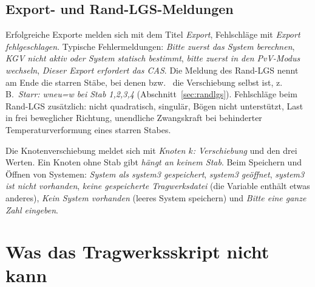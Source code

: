 \subsection{Export- und Rand-LGS-Meldungen}

Erfolgreiche Exporte melden sich mit dem Titel \emph{Export}, Fehlschläge mit \emph{Export
fehlgeschlagen}. Typische Fehlermeldungen: \emph{Bitte zuerst das System berechnen}, \emph{KGV
nicht aktiv oder System statisch bestimmt}, \emph{bitte zuerst in den PvV-Modus wechseln},
\emph{Dieser Export erfordert das CAS}. Die Meldung des Rand-LGS nennt am Ende die starren Stäbe,
bei denen  bzw.\  die Verschiebung selbst ist, z.\,B.\ \emph{Starr: wneu=w bei
Stab 1,2,3,4} (Abschnitt~\ref{sec:randlgs}). Fehlschläge beim Rand-LGS zusätzlich: nicht quadratisch, singulär,
Bögen nicht unterstützt, Last in frei beweglicher Richtung, unendliche Zwangskraft bei
behinderter Temperaturverformung eines starren Stabes.

Die Knotenverschiebung meldet sich mit \emph{Knoten $k$: Verschiebung} und den drei Werten. Ein
Knoten ohne Stab gibt \emph{hängt an keinem Stab}. Beim Speichern und Öffnen von Systemen:
\emph{System als system3 gespeichert}, \emph{system3 geöffnet}, \emph{system3 ist nicht
vorhanden}, \emph{keine gespeicherte Tragwerksdatei} (die Variable enthält etwas anderes),
\emph{Kein System vorhanden} (leeres System speichern) und \emph{Bitte eine ganze Zahl eingeben}.

\section{Was das Tragwerksskript nicht kann}

